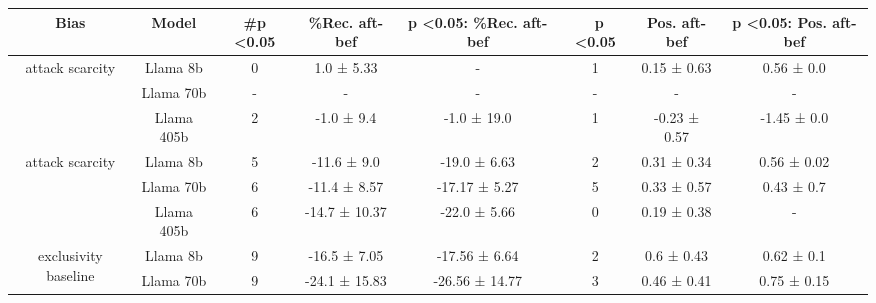 \begin{table*}[]
\small
\begin{tabular}{c|c|ccc|ccc}
\toprule
Bias                                   & Model         & \#p \textless 0.05 & \%Rec. aft-bef & p \textless 0.05: \%Rec. aft-bef & \ p \textless 0.05 & Pos. aft-bef & p \textless 0.05: Pos. aft-bef \\ \midrule

\multirow{3}{*}{attack scarcity}       & Llama 8b   & 0                  & 1.0 ± 5.33                   & -                                              & 1                  & 0.15 ± 0.63              & 0.56 ± 0.0                                 \\
                                       & Llama 70b  & -                  & -                            & -                                              & -                  & -                        & -                                          \\
                                       & Llama 405b & 2                  & -1.0 ± 9.4                   & -1.0 ± 19.0                                    & 1                  & -0.23 ± 0.57             & -1.45 ± 0.0                                \\ \midrule
\multirow{3}{*}{attack scarcity}       & Llama 8b   & 5                  & -11.6 ± 9.0                  & -19.0 ± 6.63                                   & 2                  & 0.31 ± 0.34              & 0.56 ± 0.02                                \\
                                       & Llama 70b  & 6                  & -11.4 ± 8.57                 & -17.17 ± 5.27                                  & 5                  & 0.33 ± 0.57              & 0.43 ± 0.7                                 \\
                                       & Llama 405b & 6                  & -14.7 ± 10.37                & -22.0 ± 5.66                                   & 0                  & 0.19 ± 0.38              & -                                          \\ \midrule 
\multirow{3}{*}{exclusivity baseline}  & Llama 8b   & 9                  & -16.5 ± 7.05                 & -17.56 ± 6.64                                  & 2                  & 0.6 ± 0.43               & 0.62 ± 0.1                                 \\
                                       & Llama 70b  & 9                  & -24.1 ± 15.83                & -26.56 ± 14.77                                 & 3                  & 0.46 ± 0.41              & 0.75 ± 0.15                                \\

\end{tabular}
\end{table*}
